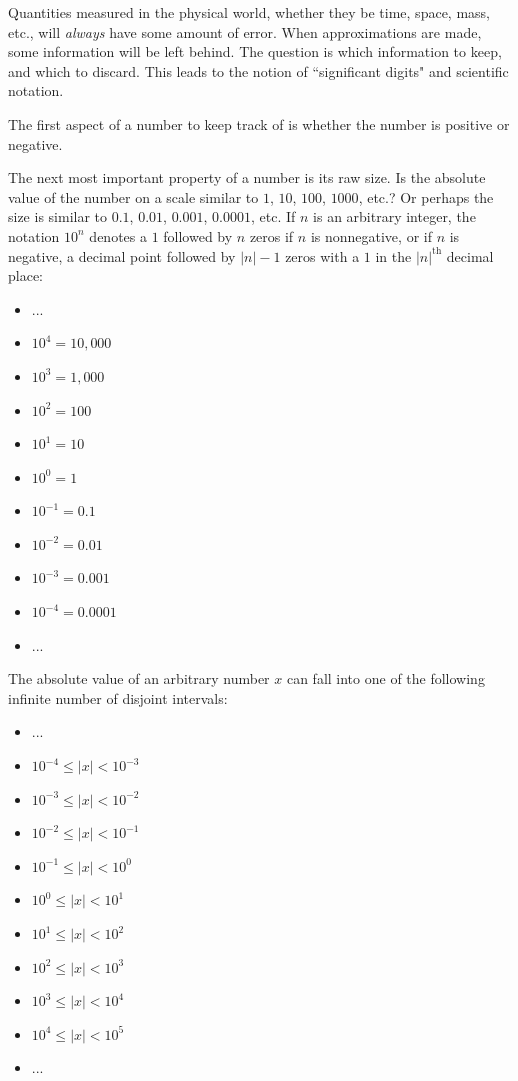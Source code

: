 \documentclass{article}
\begin{document}
Quantities measured in the physical world, whether they be time, space, mass, etc., will \emph{always} have some amount of error. When approximations are made, some information will be left behind. The question is which information to keep, and which to discard. This leads to the notion of ``significant digits" and scientific notation. 

The first aspect of a number to keep track of is whether the number is positive or negative.

The next most important property of a number is its raw size. Is the absolute value of the number on a scale similar to \(1\), \(10\), \(100\), \(1000\), etc.? Or perhaps the size is similar to \(0.1\), \(0.01\), \(0.001\), \(0.0001\), etc. If \(n\) is an arbitrary integer, the notation \(10^n\) denotes a \(1\) followed by \(n\) zeros if \(n\) is nonnegative, or if \(n\) is negative, a decimal point followed by \(|n|-1\) zeros with a \(1\) in the \(|n|^{\text{th}}\) decimal place:
\begin{itemize}
\item ...
\item \(10^4 = 10,\!000\)
\item \(10^3 = 1,\!000\)
\item \(10^2 = 100\)
\item \(10^1 = 10\)
\item \(10^0 = 1\)
\item \(10^{-1} = 0.1\)
\item \(10^{-2} = 0.01\)
\item \(10^{-3} = 0.001\)
\item \(10^{-4} = 0.0001\)
\item ...
\end{itemize}

The absolute value of an arbitrary number \(x\) can fall into one of the following infinite number of disjoint intervals:
\begin{itemize}
\item ...
\item \(10^{-4} \leq |x| < 10^{-3}\)
\item \(10^{-3} \leq |x| < 10^{-2}\)
\item \(10^{-2} \leq |x| < 10^{-1}\)
\item \(10^{-1} \leq |x| < 10^0\)
\item \(10^0 \leq |x| < 10^1\)
\item \(10^1 \leq |x| < 10^2\)
\item \(10^2 \leq |x| < 10^3\)
\item \(10^3 \leq |x| < 10^4\)
\item \(10^4 \leq |x| < 10^5\)
\item ...
\end{itemize}
\end{document}
